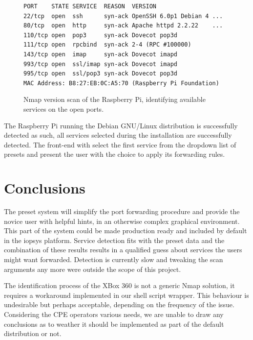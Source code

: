 \documentclass[g5paper,11pt]{kth-bcs}
\begin{document}
   \begin{figure}[t]
      \centering
      \label{fig:rasp_scan}
      \begin{lstlisting}[escapechar=!]
PORT    STATE SERVICE  REASON  VERSION
22/tcp  open  ssh      syn-ack OpenSSH 6.0p1 Debian 4 ...
80/tcp  open  http     syn-ack Apache httpd 2.2.22    ...
110/tcp open  pop3     syn-ack Dovecot pop3d
111/tcp open  rpcbind  syn-ack 2-4 (RPC #100000)
143/tcp open  imap     syn-ack Dovecot imapd
993/tcp open  ssl/imap syn-ack Dovecot imapd
995/tcp open  ssl/pop3 syn-ack Dovecot pop3d
MAC Address: B8:27:EB:0C:A5:70 (Raspberry Pi Foundation)
\end{lstlisting}
      \caption{
         \small{
Nmap version scan of the Raspberry Pi, identifying available services on the open ports.
         }
      }
   \end{figure}
The Raspberry Pi running the Debian GNU/Linux distribution is successfully detected as such, all services selected during the installation are successfully detected.
The front-end with select the first service from the dropdown list of presets and present the user with the choice to apply its forwarding rules.

\chapter{Conclusions}

The preset system will simplify the port forwarding procedure and provide the novice user with helpful hints, in an otherwise complex graphical environment.
This part of the system could be made production ready and included by default in the iopsys platform.
Service detection fits with the preset data and the combination of these results results in a qualified guess about services the users might want forwarded.
Detection is currently slow and tweaking the scan arguments any more were outside the scope of this project.

The identification process of the XBox 360 is not a generic Nmap solution, it requires a workaround implemented in our shell script wrapper.
This behaviour is undesirable but perhaps acceptable, depending on the frequency of the issue.
Considering the CPE operators various needs, we are unable to draw any conclusions as to weather it should be implemented as part of the default distribution or not.
\end{document}
